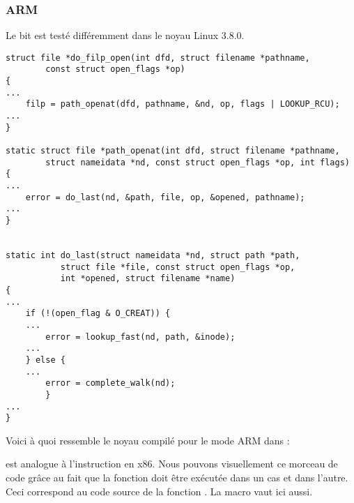 \subsubsection{ARM}


Le bit  est testé différemment dans le noyau Linux 3.8.0.

\begin{lstlisting}[caption=noyau Linux 3.8.0,style=customc]
struct file *do_filp_open(int dfd, struct filename *pathname,
		const struct open_flags *op)
{
...
	filp = path_openat(dfd, pathname, &nd, op, flags | LOOKUP_RCU);
...
}

static struct file *path_openat(int dfd, struct filename *pathname,
		struct nameidata *nd, const struct open_flags *op, int flags)
{
...
	error = do_last(nd, &path, file, op, &opened, pathname);
...
}


static int do_last(struct nameidata *nd, struct path *path,
		   struct file *file, const struct open_flags *op,
		   int *opened, struct filename *name)
{
...
	if (!(open_flag & O_CREAT)) {
    ...
		error = lookup_fast(nd, path, &inode);
    ...
	} else {
    ...
		error = complete_walk(nd);
        }
...
}
\end{lstlisting}

Voici à quoi ressemble le noyau compilé pour le mode ARM dans \IDA:



 est analogue à l'instruction \TEST en x86.
Nous pouvons  visuellement ce morceau de code grâce au fait que la fonction
 doit être exécutée dans un cas et  dans
l'autre.
Ceci correspond au code source de la fonction .
La macro  vaut  ici aussi.

